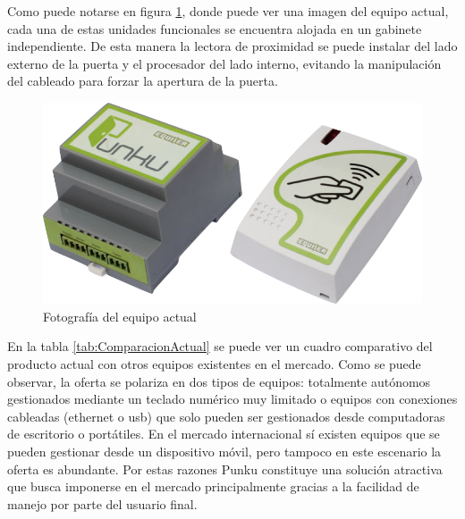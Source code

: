 Como puede notarse en figura \ref{fig:EquipoActual}, donde puede ver una imagen del equipo actual, cada una de estas unidades funcionales se encuentra alojada en un gabinete independiente. De esta manera la lectora de proximidad se puede instalar del lado externo de la puerta y el procesador del lado interno, evitando la manipulación del cableado para forzar la apertura de la puerta.

\begin{figure}[ht]
	\centering
	\vspace{3mm}
	\includegraphics[scale=.5]{./Figures/EquipoActual.png}
	\caption{Fotografía del equipo actual}
	\label{fig:EquipoActual}
\end{figure}

En la tabla \ref{tab:ComparacionActual} se puede ver un cuadro comparativo del producto actual con otros equipos existentes en el mercado. Como se puede observar, la oferta se polariza en dos tipos de equipos: totalmente autónomos gestionados mediante un teclado numérico muy limitado o equipos con conexiones cableadas (ethernet o usb) que solo pueden ser gestionados desde computadoras de escritorio o portátiles. En el mercado internacional sí existen equipos que se pueden gestionar desde un dispositivo móvil, pero tampoco en este escenario la oferta es abundante. Por estas razones Punku constituye una solución atractiva que busca imponerse en el mercado principalmente gracias a la facilidad de manejo por parte del usuario final. 

